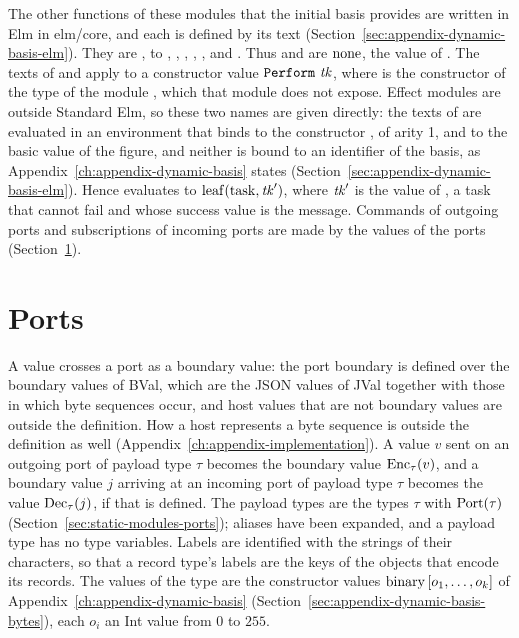 The other functions of these modules that the initial basis provides are
written in Elm in elm/core, and each is defined by its text
(Section~\ref{sec:appendix-dynamic-basis-elm}). They are ,
 to , , ,
, ,  and . %
Thus  and  are $\mathrm{none}$, the value of
. The texts of  and  apply
 to a constructor value $\kw{Perform}\ \tk$, where 
is the constructor of the type  of the module , which that
module does not expose. Effect modules are outside Standard Elm, so these two
names are given directly: the texts of  are evaluated in an
environment that binds  to the constructor , of arity
1, and  to the basic value  of the figure, and
neither is bound to an identifier of the basis, as
Appendix~\ref{ch:appendix-dynamic-basis} states
(Section~\ref{sec:appendix-dynamic-basis-elm}). %
Hence  evaluates to
$\mathrm{leaf}(\mathrm{task},\mathit{tk}')$, where $\mathit{tk}'$ is the value of
, a task that cannot fail and whose success value is
the message. Commands of outgoing ports and subscriptions of incoming ports
are made by the values of the ports (Section~\ref{sec:effects-ports}).

\section{Ports}\label{sec:effects-ports}

A value crosses a port as a boundary value: the port boundary is defined over
the boundary values of BVal, which are the JSON values of JVal together with
those in which byte sequences occur, and host values that are not boundary
values are outside the definition. How a host represents a byte sequence is
outside the definition as well
(Appendix~\ref{ch:appendix-implementation}). %
A value $v$ sent on an outgoing port of payload type $\tau$ becomes the
boundary value $\mathrm{Enc}_{\tau}(v)$, and a boundary value $j$ arriving at an
incoming port of payload type $\tau$ becomes the value $\mathrm{Dec}_{\tau}(j)$, if
that is defined.
The payload types are the types $\tau$ with $\mathrm{Port}(\tau)$
(Section~\ref{sec:static-modules-ports}); aliases have been expanded, and a
payload type has no type variables. Labels are identified with the strings of
their characters, so that a record type's labels are the keys of the objects
that encode its records. The values of the type  are the
constructor values $\mathrm{binary}\,[o_1,\ldots,o_k]$ of
Appendix~\ref{ch:appendix-dynamic-basis}
(Section~\ref{sec:appendix-dynamic-basis-bytes}), each $o_i$ an Int value
from $0$ to $255$. %

